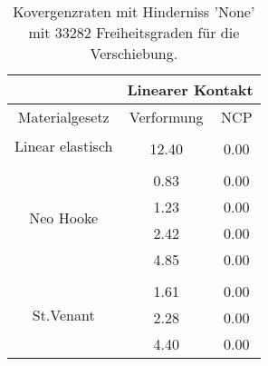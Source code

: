 \begin{table} 
\centering 
\begin{tabular}{c|cc|} 
\cline{2-3} 
 & \multicolumn{2}{|c|}{Linearer Kontakt} \\ 
\hline 
\multicolumn{1}{|c|}{Materialgesetz} & \multicolumn{1}{c|}{Verformung} & \multicolumn{1}{c|}{NCP} \\ 
\hline 
\multicolumn{1}{|c|}{\multirow{2}{*}{Linear elastisch}} &\multicolumn{1}{|c|}{} & \multicolumn{1}{|c|}{} \\ 
\multicolumn{1}{|c|}{} & \multicolumn{1}{|c|}{     12.40} & \multicolumn{1}{|c|}{      0.00} \\ 
\hline 
\multicolumn{1}{|c|}{\multirow{5}{*}{Neo Hooke}} &\multicolumn{1}{|c|}{} & \multicolumn{1}{|c|}{} \\ 
\multicolumn{1}{|c|}{} & \multicolumn{1}{|c|}{      0.83} & \multicolumn{1}{|c|}{      0.00} \\ 
\multicolumn{1}{|c|}{} & \multicolumn{1}{|c|}{      1.23} & \multicolumn{1}{|c|}{      0.00} \\ 
\multicolumn{1}{|c|}{} & \multicolumn{1}{|c|}{      2.42} & \multicolumn{1}{|c|}{      0.00} \\ 
\multicolumn{1}{|c|}{} & \multicolumn{1}{|c|}{      4.85} & \multicolumn{1}{|c|}{      0.00} \\ 
\hline 
\multicolumn{1}{|c|}{\multirow{4}{*}{St.Venant}} &\multicolumn{1}{|c|}{} & \multicolumn{1}{|c|}{} \\ 
\multicolumn{1}{|c|}{} & \multicolumn{1}{|c|}{      1.61} & \multicolumn{1}{|c|}{      0.00} \\ 
\multicolumn{1}{|c|}{} & \multicolumn{1}{|c|}{      2.28} & \multicolumn{1}{|c|}{      0.00} \\ 
\multicolumn{1}{|c|}{} & \multicolumn{1}{|c|}{      4.40} & \multicolumn{1}{|c|}{      0.00} \\ 
\hline 
\end{tabular}\caption{Kovergenzraten mit Hinderniss 'None' mit 33282 Freiheitsgraden für die Verschiebung.}\label{tab:Rate_None_level6}
\end{table} 
